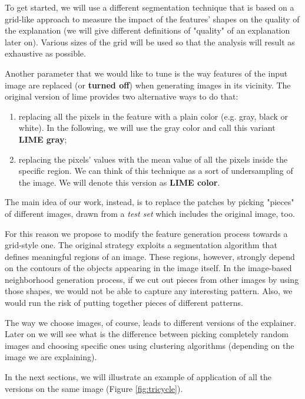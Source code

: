 \documentclass[12pt, twoside, a4paper]{report}
\begin{document}
To get started, we will use a different segmentation technique that is based on a grid-like approach to measure the impact of the features' shapes on the quality of the explanation (we will give different definitions of "quality" of an explanation later on). Various sizes of the grid will be used so that the analysis will result as exhaustive as possible. 

Another parameter that we would like to tune is the way features of the input image are replaced (or \textbf{turned off}) when generating images in its vicinity. The original version of lime provides two alternative ways to do that:

\begin{enumerate}
\item replacing all the pixels in the feature with a plain color (e.g. gray, black or white). In the following, we will use the gray color and call this variant \textbf{LIME gray};
\item replacing the pixels' values with the mean value of all the pixels inside the specific region. We can think of this technique as a sort of undersampling of the image. We will denote this version as \textbf{LIME color}.
\end{enumerate}

The main idea of our work, instead, is to replace the patches by picking "pieces" of different images, drawn from a \textit{test set} which includes the original image, too.

For this reason we propose to modify the feature generation process towards a grid-style one. The original strategy exploits a segmentation algorithm that defines meaningful regions of an image. These regions, however, strongly depend on the contours of the objects appearing in the image itself. In the image-based neighborhood generation process, if we cut out pieces from other images by using those shapes, we would not be able to capture any interesting pattern. Also, we would run the risk of putting together pieces of different patterns.

The way we choose images, of course, leads to different versions of the explainer. Later on we will see what is the difference between picking completely random images and choosing specific ones using clustering algorithms (depending on the image we are explaining). 

In the next sections, we will illustrate an example of application of all the versions on the same image (Figure \ref{fig:tricycle}).
\end{document}
